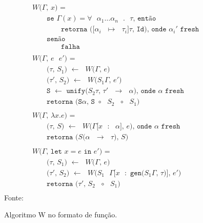 \begin{figure}[ht!]
  \caption{Algoritmo W no formato de função.}
  \centering
  \begin{align*}
     & \texttt{$W$($\Gamma$, $x$) = }                                                                                     \\
     & \qquad{}\texttt{se $\Gamma(x) = \forall$ $\alpha_1 \ldots \alpha_n$ $.$ $\tau$, então}                     \\
     & \qquad{}\qquad{}\texttt{retorna ([$\alpha_i$ $\mapsto$ $\tau_i$]$\tau$, Id), onde $\alpha_i'$ fresh}       \\
     & \qquad{}\texttt{senão}                                                                                     \\
     & \qquad{}\qquad{}\texttt{falha}                                                                             \\
    \\
     & \texttt{$W$($\Gamma$, $e$ $e'$) = }                                                                                \\
     & \qquad{}\texttt{($\tau$, $S_1$) $\leftarrow$ $W$($\Gamma$, $e$)}                                           \\
     & \qquad{}\texttt{($\tau'$, $S_2$) $\leftarrow$ $W$($S_1\Gamma$, $e'$)}                                      \\
     & \qquad{}\texttt{S $\leftarrow$ unify($S_2\tau$, $\tau'$ $\to$ $\alpha$), onde $\alpha$ fresh}              \\
     & \qquad{}\texttt{retorna (S$\alpha$, S $\circ$ $S_2$ $\circ$ $S_1$)}                                        \\
    \\
     & \texttt{$W$($\Gamma$, $\lambda x.e$) = }                                                                           \\
     & \qquad{}\texttt{($\tau$, $S$) $\leftarrow$ $W$($\Gamma$[$x$ $:$ $\alpha$], $e$), onde $\alpha$ fresh}      \\
     & \qquad{}\texttt{retorna ($S$($\alpha$ $\to$ $\tau$), $S$)}                                                 \\
    \\
     & \texttt{$W$($\Gamma$, let $x = e$ in $e'$) = }                                                                     \\
     & \qquad{}\texttt{($\tau$, $S_1$) $\leftarrow$ $W$($\Gamma$, $e$)}                                           \\
     & \qquad{}\texttt{($\tau'$, $S_2$) $\leftarrow$ $W$($S_1$ $\Gamma$[$x$ $:$ gen($S_1\Gamma$, $\tau$)], $e'$)} \\
     & \qquad{}\texttt{retorna ($\tau'$, $S_2$ $\circ$ $S_1$)}                                                    \\
  \end{align*}
  \small{Fonte:~\cite{CASTRO2019}}\label{algo:w}
\end{figure}

